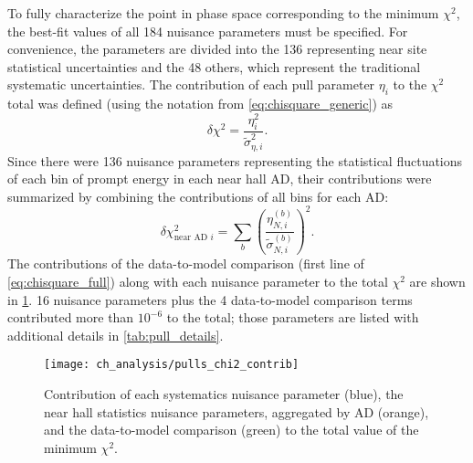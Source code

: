 To fully characterize the point in phase space
corresponding to the minimum $\chi^2$,
the best-fit values of all 184 nuisance parameters must be specified.
For convenience, the parameters are divided into
the 136 representing near site statistical uncertainties
and the 48 others, which represent the traditional systematic uncertainties.
The contribution of each pull parameter $\eta_i$ to the $\chi^2$ total
was defined (using the notation from \cref{eq:chisquare_generic}) as
\begin{equation}\label{eq:pull_contrib}
    \delta\chi^2 = \frac{\eta_i^2}{\tilde{\sigma}_{\eta,i}^2}.
\end{equation}
Since there were 136 nuisance parameters representing
the statistical fluctuations of each bin of prompt energy
in each near hall AD,
their contributions were summarized by combining the contributions
of all bins for each AD:
\begin{equation}\label{eq:pull_near_contrib}
    \delta\chi^2_{\text{near AD }i} = \sum_b \left(
        \frac{\eta_{N,i}^{(b)}}{\tilde{\sigma}_{N,i}^{(b)}}
    \right)^2.
\end{equation}
The contributions of the data-to-model comparison
(first line of \cref{eq:chisquare_full})
along with each nuisance parameter
to the total $\chi^2$
are shown in \cref{fig:syst_pulls_plot}.
16 nuisance parameters plus the 4 data-to-model comparison terms
contributed more than $10^{-6}$ to the total;
those parameters are listed with additional details
in \cref{tab:pull_details}.

\begin{figure}
    \centering
    \texttt{[image: ch\_analysis/pulls\_chi2\_contrib]}
    \caption[Contributions to minimum $\chi^2$]{
        Contribution of each systematics nuisance parameter (blue),
        the near hall statistics nuisance parameters,
        aggregated by AD (orange),
        and the data-to-model comparison (green)
        to the total value of the minimum $\chi^2$.
    }
    \label{fig:syst_pulls_plot}
\end{figure}

